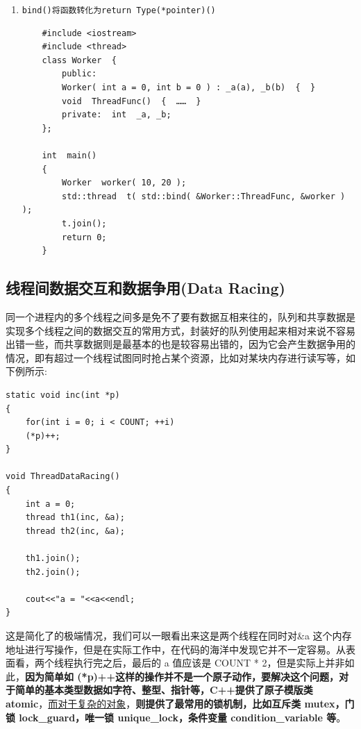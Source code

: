 \documentclass[UTF8,a4paper,12pt]{ctexbook}
\begin{document}
\begin{enumerate}[itemindent = 1em]
\begin{lstlisting}
	void threadRunMemberFunction(void)
	{
		God god;
		string s = "some";
		thread* t = new thread( &God::create, god, s );// 虽然函数定义为引用，但是还是值传递参数，如果需要引用，需要添加std::ref(s);
		// t = new thread(&God::create,god,std::ref(s)); 这样才会真正的引用传递参数
		t->join();
		delete t;
	}

// Method2:
	class Factor{
	public:
		void operater() (int a){
			cout <<"create"<< a <<endl;
		}
	};

	void threadRunObject(void)
	{
		Factor factor;
		int a = 1;
		
		thread t(factor, a);
		thread t2(Factor(),a)
		t.join();
		t2.join();
	}
			\end{lstlisting}
			
			\item  \verb|bind()将函数转化为return Type(*pointer)()|
				\begin{lstlisting}
	#include <iostream>
	#include <thread>
	class Worker  {
		public:
		Worker( int a = 0, int b = 0 ) : _a(a), _b(b)  {  }
		void  ThreadFunc()  {  ……  }
		private:  int  _a, _b;
	};
	
	int  main()
	{
		Worker  worker( 10, 20 );
		std::thread  t( std::bind( &Worker::ThreadFunc, &worker ) );
		t.join();
		return 0;
	}
				\end{lstlisting}
		\end{enumerate}
		
	\subsection{线程间数据交互和数据争用(Data Racing)}
		同一个进程内的多个线程之间多是免不了要有数据互相来往的，队列和共享数据是实现多个线程之间的数据交互的常用方式，封装好的队列使用起来相对来说不容易出错一些，而共享数据则是最基本的也是较容易出错的，因为它会产生数据争用的情况，即有超过一个线程试图同时抢占某个资源，比如对某块内存进行读写等，如下例所示:
		\begin{lstlisting}
static void inc(int *p)
{
	for(int i = 0; i < COUNT; ++i)
	(*p)++;
}
		
void ThreadDataRacing()
{
	int a = 0;
	thread th1(inc, &a);
	thread th2(inc, &a);
		
	th1.join();
	th2.join();
		
	cout<<"a = "<<a<<endl;
}
		\end{lstlisting}
		
		这是简化了的极端情况，我们可以一眼看出来这是两个线程在同时对\&a 这个内存地址进行写操作，但是在实际工作中，在代码的海洋中发现它并不一定容易。从表面看，两个线程执行完之后，最后的 a 值应该是 COUNT * 2，但是实际上并非如此，\textbf{因为简单如 (*p)++这样的操作并不是一个原子动作，要解决这个问题，对于简单的基本类型数据如字符、整型、指针等，C++提供了原子模版类 atomic}，\underline{而对于复杂的对象}，\textbf{则提供了最常用的锁机制，比如互斥类 mutex，门锁 lock\_guard，唯一锁 unique\_lock，条件变量 condition\_variable 等}。
		
\end{document}
